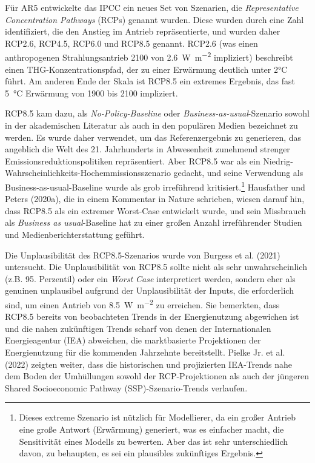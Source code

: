 \documentclass[12pt,paper=a4,DIV=12,parskip=never,chapterprefix=false,headings=standardclasses]{scrreprt}
\begin{document}
Für AR5 entwickelte das IPCC ein neues Set von Szenarien, die \emph{Representative Concentration Pathways} (RCPs) genannt wurden. Diese wurden durch eine Zahl identifiziert, die den Anstieg im Antrieb repräsentierte, und wurden daher RCP2.6, RCP4.5, RCP6.0 und RCP8.5 genannt. RCP2.6 (was einen anthropogenen Strahlungsantrieb 2100 von \SI{2.6}{\watt\per\square\meter} impliziert) beschreibt einen THG-Konzentrationspfad, der zu einer Erwärmung deutlich unter 2°C führt. Am anderen Ende der Skala ist RCP8.5 ein extremes Ergebnis, das fast \SI{5}{\celsius} Erwärmung von 1900 bis 2100 impliziert.

RCP8.5 kam dazu, als \emph{No-Policy-Baseline} oder \emph{Business-as-usual}-Szenario sowohl in der akademischen Literatur als auch in den populären Medien bezeichnet zu werden. Es wurde daher verwendet, um das Referenzergebnis zu generieren, das angeblich die Welt des 21. Jahrhunderts in Abwesenheit zunehmend strenger Emissionsreduktionspolitiken repräsentiert. Aber RCP8.5 war als ein Niedrig-Wahrscheinlichkeits-Hochemmissionsszenario gedacht, und seine Verwendung als Business-as-usual-Baseline wurde als grob irreführend kritisiert.\footnote{Dieses extreme Szenario ist nützlich für Modellierer, da ein großer Antrieb eine große Antwort (Erwärmung) generiert, was es einfacher macht, die Sensitivität eines Modells zu bewerten. Aber das ist sehr unterschiedlich davon, zu behaupten, es sei ein plausibles zukünftiges Ergebnis.} Hausfather und Peters (2020a), die in einem Kommentar in Nature schrieben, wiesen darauf hin, dass RCP8.5 als ein extremer Worst-Case entwickelt wurde, und sein Missbrauch als \emph{Business as usual}-Baseline hat zu einer großen Anzahl irreführender Studien und Medienberichterstattung geführt.

Die Unplausibilität des RCP8.5-Szenarios wurde von Burgess et al. (2021) untersucht. Die Unplausibilität von RCP8.5 sollte nicht als sehr unwahrscheinlich (z.B. 95. Perzentil) oder ein \emph{Worst Case} interpretiert werden, sondern eher als genuinen unplausibel aufgrund der Unplausibilität der Inputs, die erforderlich sind, um einen Antrieb von \SI{8.5}{\watt\per\square\meter} zu erreichen. Sie bemerkten, dass RCP8.5 bereits von beobachteten Trends in der Energienutzung abgewichen ist und die nahen zukünftigen Trends scharf von denen der Internationalen Energieagentur (IEA) abweichen, die marktbasierte Projektionen der Energienutzung für die kommenden Jahrzehnte bereitstellt. Pielke Jr. et al. (2022) zeigten weiter, dass die historischen und projizierten IEA-Trends nahe dem Boden der Umhüllungen sowohl der RCP-Projektionen als auch der jüngeren Shared Socioeconomic Pathway (SSP)-Szenario-Trends verlaufen.
\end{document}
